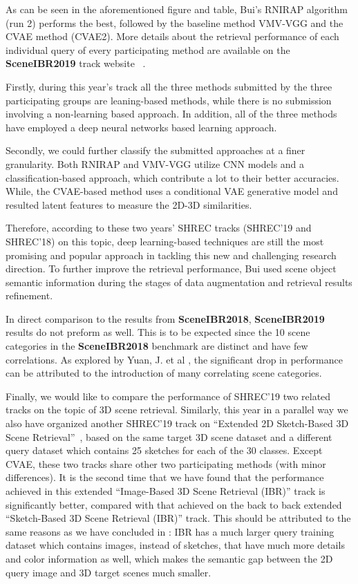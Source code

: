 \documentclass[../main.tex]{subfiles}
\begin{document}
As can be seen in the aforementioned figure and table, Bui's RNIRAP algorithm 
(run 2) performs the best, followed by the baseline method VMV-VGG and the CVAE 
method (CVAE2). More details about the retrieval performance of each individual 
query of every participating method are available on the \textbf{SceneIBR2019} 
track website~\cite{SceneIBR19} . 

Firstly, during this year's track all the three methods submitted by the three 
participating groups are leaning-based methods, while there is no submission 
involving a non-learning based approach. In addition, all of the three methods 
have employed a deep neural networks based learning approach. 

Secondly, we could further classify the submitted approaches at a finer granularity. Both RNIRAP and VMV-VGG utilize CNN models and a classification-based approach, which contribute a lot to their better accuracies. While, the CVAE-based method uses a conditional VAE generative model and resulted latent features to measure the 2D-3D similarities. 

Therefore, according to these two years' SHREC tracks (SHREC'19 and SHREC'18) on this topic, deep learning-based techniques are still the most promising and popular approach in tackling this new and challenging research direction. To further improve the retrieval performance, Bui used scene object semantic information during the stages of data augmentation and retrieval results refinement.

In direct comparison to the results from \textbf{SceneIBR2018}, 
\textbf{SceneIBR2019} results do not preform as well. This is to be expected 
since the 10 scene categories in the \textbf{SceneIBR2018} benchmark are
distinct and have few correlations. As explored by Yuan, J. et al \cite{MIPR}, the significant drop in performance can be attributed to the introduction of 
many correlating scene categories. 


Finally, we would like to compare the performance of SHREC'19 two related 
tracks on the topic of 3D scene retrieval. Similarly, this year in a parallel 
way we also have organized another SHREC'19 track on ``Extended 2D Sketch-Based 
3D Scene Retrieval''~\cite{SceneIBR19}, based on the same target 3D scene 
dataset and a different query dataset which contains 25 sketches for each of 
the 30 classes. Except CVAE, these two tracks share other two participating 
methods (with minor differences). It is the second time 
that we have found that the performance achieved in this 
extended ``Image-Based 3D Scene Retrieval 
(IBR)'' track is significantly better, compared with that achieved on the back 
to back extended ``Sketch-Based 3D Scene Retrieval (IBR)'' track. This should 
be attributed to the same reasons as we 
have concluded in \cite{SceneIBR18Journal, SceneIBR18Website}: IBR has a 
much larger query training dataset which contains images, instead of sketches, 
that have much more details and color information as well, which makes the 
semantic gap between the 2D query image and 3D target scenes much smaller.  
\end{document}
